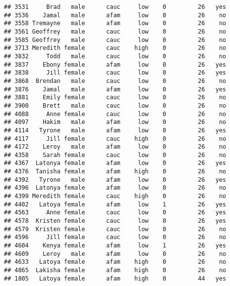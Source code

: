\documentclass[
]{article}
\newenvironment{Shaded}{\begin{snugshade}}{\end{snugshade}}
\newcommand{\CommentTok}[1]{\textcolor[rgb]{0.56,0.35,0.01}{\textit{#1}}}
\newcommand{\DecValTok}[1]{\textcolor[rgb]{0.00,0.00,0.81}{#1}}
\newcommand{\KeywordTok}[1]{\textcolor[rgb]{0.13,0.29,0.53}{\textbf{#1}}}
\newcommand{\NormalTok}[1]{#1}
\newcommand{\OperatorTok}[1]{\textcolor[rgb]{0.81,0.36,0.00}{\textbf{#1}}}
\newcommand{\StringTok}[1]{\textcolor[rgb]{0.31,0.60,0.02}{#1}}
\begin{document}
\begin{verbatim}
## 3531     Brad   male      cauc     low    0         26   yes
## 3536    Jamal   male      afam     low    0         26    no
## 3558 Tremayne   male      afam     low    0         26    no
## 3561 Geoffrey   male      cauc     low    0         26    no
## 3585 Geoffrey   male      cauc     low    0         26    no
## 3713 Meredith female      cauc    high    0         26    no
## 3832     Todd   male      cauc     low    0         26    no
## 3837    Ebony female      afam     low    0         26   yes
## 3838     Jill female      cauc     low    0         26   yes
## 3868  Brendan   male      cauc     low    0         26    no
## 3876    Jamal   male      afam     low    0         26   yes
## 3881    Emily female      cauc     low    0         26    no
## 3900    Brett   male      cauc     low    0         26    no
## 4088     Anne female      cauc     low    0         26    no
## 4097    Hakim   male      afam     low    0         26    no
## 4114   Tyrone   male      afam     low    0         26   yes
## 4117     Jill female      cauc    high    0         26    no
## 4172    Leroy   male      afam     low    0         26    no
## 4358    Sarah female      cauc     low    0         26    no
## 4367  Latonya female      afam     low    0         26   yes
## 4376  Tanisha female      afam    high    0         26    no
## 4392   Tyrone   male      afam     low    0         26   yes
## 4396  Latonya female      afam     low    0         26    no
## 4399 Meredith female      cauc    high    0         26    no
## 4402   Latoya female      afam     low    1         26   yes
## 4563     Anne female      cauc     low    0         26   yes
## 4578  Kristen female      cauc     low    0         26   yes
## 4579  Kristen female      cauc     low    0         26    no
## 4596     Jill female      cauc     low    0         26    no
## 4604    Kenya female      afam     low    1         26   yes
## 4609    Leroy   male      afam     low    0         26    no
## 4633   Latoya female      afam    high    0         26    no
## 4865  Lakisha female      afam    high    0         26    no
## 1805   Latoya female      afam    high    0         44   yes
\end{verbatim}

\begin{Shaded}
\end{Shaded}
\end{document}
